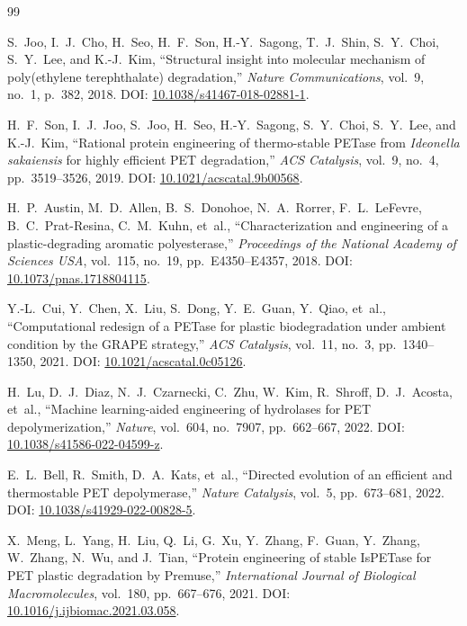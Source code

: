 \documentclass[10pt,twocolumn]{article}
\begin{document}
\begin{thebibliography}{99}

S.~Joo, I.~J.~Cho, H.~Seo, H.~F.~Son, H.-Y.~Sagong, T.~J.~Shin, S.~Y.~Choi, S.~Y.~Lee, and K.-J.~Kim,
``Structural insight into molecular mechanism of poly(ethylene terephthalate) degradation,''
\textit{Nature Communications}, vol.~9, no.~1, p.~382, 2018.
\newblock DOI: \href{https://doi.org/10.1038/s41467-018-02881-1}{10.1038/s41467-018-02881-1}.

H.~F.~Son, I.~J.~Joo, S.~Joo, H.~Seo, H.-Y.~Sagong, S.~Y.~Choi, S.~Y.~Lee, and K.-J.~Kim,
``Rational protein engineering of thermo-stable PETase from \textit{Ideonella sakaiensis} for highly efficient PET degradation,''
\textit{ACS Catalysis}, vol.~9, no.~4, pp.~3519--3526, 2019.
\newblock DOI: \href{https://doi.org/10.1021/acscatal.9b00568}{10.1021/acscatal.9b00568}.

H.~P.~Austin, M.~D.~Allen, B.~S.~Donohoe, N.~A.~Rorrer, F.~L.~LeFevre, B.~C.~Prat-Resina, C.~M.~Kuhn, et~al.,
``Characterization and engineering of a plastic-degrading aromatic polyesterase,''
\textit{Proceedings of the National Academy of Sciences USA}, vol.~115, no.~19, pp.~E4350--E4357, 2018.
\newblock DOI: \href{https://doi.org/10.1073/pnas.1718804115}{10.1073/pnas.1718804115}.

Y.-L.~Cui, Y.~Chen, X.~Liu, S.~Dong, Y.~E.~Guan, Y.~Qiao, et~al.,
``Computational redesign of a PETase for plastic biodegradation under ambient condition by the GRAPE strategy,''
\textit{ACS Catalysis}, vol.~11, no.~3, pp.~1340--1350, 2021.
\newblock DOI: \href{https://doi.org/10.1021/acscatal.0c05126}{10.1021/acscatal.0c05126}.

H.~Lu, D.~J.~Diaz, N.~J.~Czarnecki, C.~Zhu, W.~Kim, R.~Shroff, D.~J.~Acosta, et~al.,
``Machine learning-aided engineering of hydrolases for PET depolymerization,''
\textit{Nature}, vol.~604, no.~7907, pp.~662--667, 2022.
\newblock DOI: \href{https://doi.org/10.1038/s41586-022-04599-z}{10.1038/s41586-022-04599-z}.

E.~L.~Bell, R.~Smith, D.~A.~Kats, et~al.,
``Directed evolution of an efficient and thermostable PET depolymerase,''
\textit{Nature Catalysis}, vol.~5, pp.~673--681, 2022.
\newblock DOI: \href{https://doi.org/10.1038/s41929-022-00828-5}{10.1038/s41929-022-00828-5}.

X.~Meng, L.~Yang, H.~Liu, Q.~Li, G.~Xu, Y.~Zhang, F.~Guan, Y.~Zhang, W.~Zhang, N.~Wu, and J.~Tian,
``Protein engineering of stable IsPETase for PET plastic degradation by Premuse,''
\textit{International Journal of Biological Macromolecules}, vol.~180, pp.~667--676, 2021.
\newblock DOI: \href{https://doi.org/10.1016/j.ijbiomac.2021.03.058}{10.1016/j.ijbiomac.2021.03.058}.


\end{thebibliography}
\end{document}

